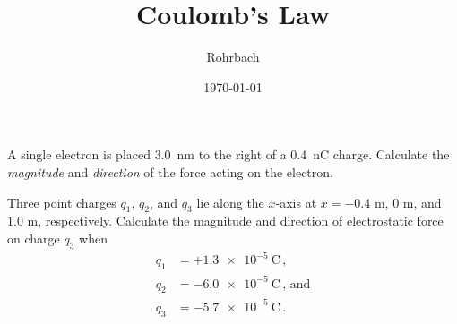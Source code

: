 \documentclass[10pt]{exam}
\title{Coulomb's Law}
\author{Rohrbach}
\date{\today}
\begin{document}
\maketitle

\begin{questions}

\question
A single electron is placed \SI{3.0}{nm} to the right of a \SI{+0.4}{nC} charge.  Calculate the \emph{magnitude} and \emph{direction} of the force acting on the electron.

\vspace{7em}

\question
Three point charges $q_1$, $q_2$, and $q_3$ lie along the $x$-axis at $x=-0.4$ m, $0$ m, and $1.0$ m, respectively.  Calculate the magnitude and direction of electrostatic force on charge $q_3$ when
%
\begin{align*}
q_1 &=+\SI{1.3e-5}{\coulomb}\, ,  \\
q_2 &=-\SI{6.0e-5}{\coulomb}\, \text{, and} \\
q_3 &=-\SI{5.7e-5}{\coulomb}\, .
\end{align*} 


  
\end{questions}
\end{document}
